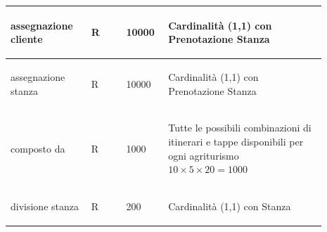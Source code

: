\documentclass[12pt,a4paper]{article}
\begin{document}
\begin{center}
\begin{longtable}{|p{0.23\linewidth}|p{0.1\linewidth}|p{0.11\linewidth}|p{0.45\linewidth}|}
\hline
assegnazione cliente
 & 
\begin{center}\vspace{-25pt}R\end{center}
 & 
\begin{center}\vspace{-25pt}10000\end{center}
 & 
\begin{flushleft}\vspace{-25pt}Cardinalità (1,1) con Prenotazione Stanza\end{flushleft}
\\

\hline
assegnazione stanza
 & 
\begin{center}\vspace{-25pt}R\end{center}
 & 
\begin{center}\vspace{-25pt}10000\end{center}
 & 
\begin{flushleft}\vspace{-25pt}Cardinalità (1,1) con Prenotazione Stan\-za \end{flushleft}
\\

\hline
composto da
 & 
\begin{center}\vspace{-25pt}R\end{center}
 & 
\begin{center}\vspace{-25pt}1000\end{center}
 & 
\begin{flushleft}\vspace{-25pt}Tutte le possibili combinazioni di itinerari e tappe disponibili per ogni agriturismo $10\times 5 \times 20 = 1000$\end{flushleft}
\\

\hline
divisione stanza
 & 
\begin{center}\vspace{-25pt}R\end{center}
 & 
\begin{center}\vspace{-25pt}200\end{center}
 & 
\begin{flushleft}\vspace{-25pt}Cardinalità (1,1) con Stanza\end{flushleft}
\\


\end{longtable}
\end{center}
\end{document}
